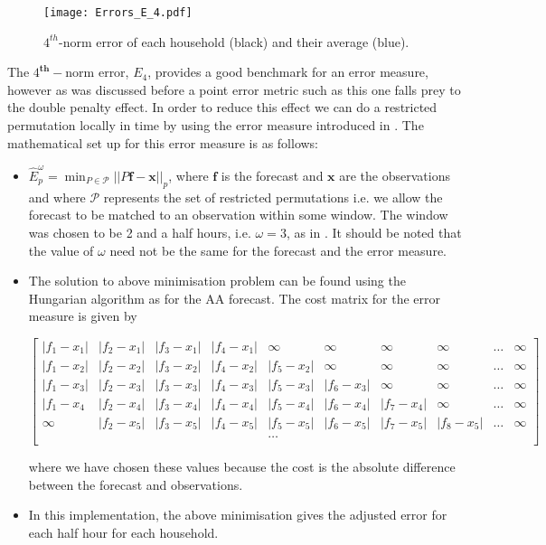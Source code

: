 \begin{figure}
\centering
\texttt{[image: Errors\_E\_4.pdf]}
\caption{\label{fig:m4e_all} $4^{th}$-norm error of each household (black) and their average (blue).}
\end{figure}


The $4^{\textbf{th}}-$norm error, $E_4$, provides a good benchmark for an error measure, however as was discussed before a point error metric such as this one falls prey to the double penalty effect. In order to reduce this effect we can do a restricted permutation locally in time by using the error measure introduced in \citet{dan14}. The mathematical set up for this error measure is as follows:
\begin{itemize}
\item $\hat{E}_p^\omega = \displaystyle{\min_{P \in \mathscr{P}}||P\boldsymbol{f}-\boldsymbol{x}||_p}$, where $\boldsymbol{f}$ is the forecast and $\boldsymbol{x}$ are the observations and where $\mathscr{P}$ represents the set of restricted permutations i.e. we allow the forecast to be matched to an observation within some window. The window was chosen to be 2 and a half hours, i.e. $\omega = 3$, as in \cite{dan14}. It should be noted that the value of $\omega$ need not be the same for the forecast and the error measure.
\item The solution to above minimisation problem can be found using the Hungarian algorithm as for the AA forecast. The cost matrix for the error measure is given by


\begin{small}\centerline{$\begin{bmatrix}
    |f_1 - x_1| & |f_2 - x_1| & |f_3 - x_1| & |f_4 - x_1|  & \infty& \infty& \infty &\infty & \dots & \infty \\
    |f_1 - x_2| & |f_2 - x_2| & |f_3 - x_2| &  |f_4 - x_2| & |f_5 - x_2| & \infty  &\infty & \infty & \dots & \infty\\
    |f_1 - x_3| & |f_2 - x_3| & |f_3 - x_3| &  |f_4 - x_3|& |f_5- x_3|& |f_6 - x_3| & \infty&\infty & \dots  & \infty\\
    |f_1 - x_4 & |f_2 - x_4| & |f_3 - x_4| & |f_4 - x_4| &  |f_5 - x_4|& |f_6- x_4|& |f_7 - x_4| & \infty&\dots & \infty\\
    \infty & |f_2 - x_5| & |f_3 - x_5| & |f_4 - x_5| &  |f_5 - x_5|& |f_6- x_5|& |f_7 - x_5| & |f_8 -x_5|&\dots & \infty\\
   &&&& \dots &&&&& \\
\end{bmatrix}$} \end{small}

\noindent where we have chosen these values because the cost is the absolute difference between the forecast and observations.  
\item In this implementation, the above minimisation gives the adjusted error for each half hour for each household.
\end{itemize}

